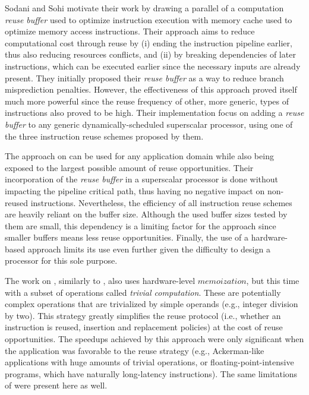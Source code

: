 Sodani and Sohi \cite{reuse2} motivate their work by drawing a parallel of a computation \textit{reuse buffer} used to optimize instruction execution with memory cache used to optimize memory access instructions. Their approach aims to reduce computational cost through reuse by (i) ending the instruction pipeline earlier, thus also reducing resources conflicts, and (ii) by breaking dependencies of later instructions, which can be executed earlier since the necessary inputs are already present. They initially proposed their \textit{reuse buffer} as a way to reduce branch misprediction penalties. However, the effectiveness of this approach proved itself much more powerful since the reuse frequency of other, more generic, types of instructions also proved to be high. Their implementation focus on adding a \textit{reuse buffer} to any generic dynamically-scheduled superscalar processor, using one of the three instruction reuse schemes proposed by them. 

The approach on \cite{reuse2} can be used for any application domain while also being exposed to the largest possible amount of reuse opportunities. Their incorporation of the \textit{reuse buffer} in a superscalar processor is done without impacting the pipeline  critical path, thus having no negative impact on non-reused instructions. Nevertheless, the efficiency of all instruction reuse schemes are heavily reliant on the buffer size. Although the used buffer sizes tested by them are small, this dependency is a limiting factor for the approach since smaller buffers means less reuse opportunities. Finally, the use of a hardware-based approach limits its use even further given the difficulty to design a processor for this sole purpose.

The work on \cite{reuse3}, similarly to \cite{reuse2}, also uses hardware-level $memoization$, but this time with a subset of operations called \textit{trivial computation}. These are potentially complex operations that are trivialized by simple operands (e.g., integer division by two). This strategy greatly simplifies the reuse protocol (i.e., whether an instruction is reused, insertion and replacement policies) at the cost of reuse opportunities. The speedups achieved by this approach were only significant when the application was favorable to the reuse strategy (e.g., Ackerman-like applications with huge amounts of trivial operations, or floating-point-intensive programs, which have naturally long-latency instructions). The same limitations of \cite{reuse2} were present here as well.

